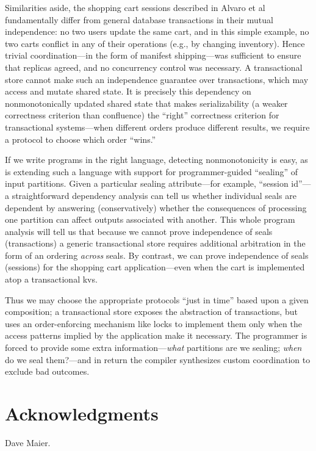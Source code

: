 \documentclass{sig-alternate}
\begin{document}
Similarities aside, the shopping cart sessions described in Alvaro et al fundamentally differ from general database transactions in their mutual independence: no two users update the same cart, and in this simple example, no two carts conflict in any of their operations (e.g., by changing inventory).  Hence trivial coordination---in the form of manifest shipping---was sufficient to ensure that replicas agreed, and no concurrency control was necessary.  A transactional store cannot make such an independence guarantee over transactions, which may access and mutate shared state.   It is precisely this dependency on nonmonotonically updated shared state that makes serializability (a weaker correctness criterion than confluence) the ``right'' correctness criterion for transactional systems---when different orders produce different results, we require a protocol to choose which order ``wins.'' 

If we write programs in the right language, detecting nonmonotonicity is easy, as is extending such a language with support for programmer-guided ``sealing'' of input partitions.  Given a particular sealing attribute---for example, ``session id''---a straightforward dependency analysis can tell us whether individual seals are dependent by answering (conservatively) whether the consequences of processing one partition can affect outputs associated with another.  This whole program analysis will tell us that because we cannot prove independence of seals (transactions) a generic transactional store requires additional arbitration in the form of an ordering \emph{across} seals.  By contrast, we can prove independence of seals (sessions) for the shopping cart application---even when the cart is implemented atop a transactional kvs.  

Thus we may choose the appropriate protocols ``just in time'' based upon a given composition; a transactional store exposes the abstraction of transactions, but uses an order-enforcing mechanism like locks to implement them only when the access patterns implied by the application make it necessary. The programmer is forced to provide some extra information---\emph{what} partitions are we sealing; \emph{when} do we seal them?---and in return the compiler synthesizes custom coordination to exclude bad outcomes.  




\section{Acknowledgments}
Dave Maier.



\end{document}
